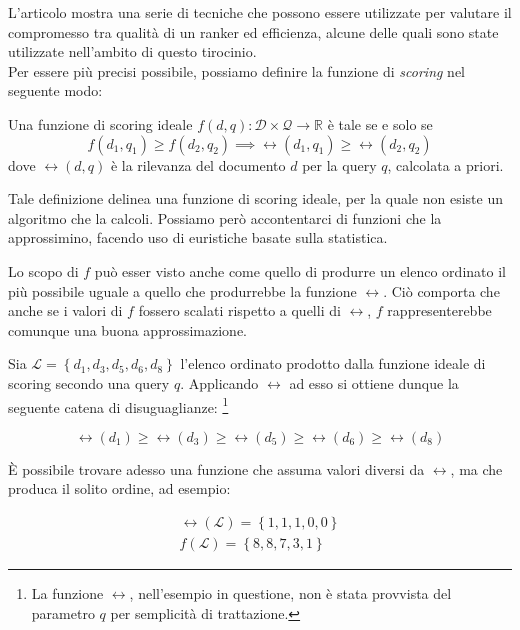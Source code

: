 L'articolo \cite{10.1016/j.ipm.2016.05.004} mostra una serie di tecniche che possono essere
utilizzate per valutare il compromesso tra qualità di un ranker ed efficienza, 
alcune delle quali sono state utilizzate nell'ambito di questo tirocinio.\\
Per essere più precisi possibile, possiamo definire la funzione di \textit{scoring} nel seguente modo:

\begin{definizione}\label{def:funzione_di_score_ideale}
	Una funzione di scoring ideale $f(d,q) : \mathcal{D} \times \mathcal{Q} \rightarrow \mathbb{R}$ è tale
	se e solo se
	$$
	f(d_1,q_1) \geq f(d_2, q_2) \implies \rel(d_1, q_1) \geq \rel(d_2, q_2)
	$$
dove $\rel(d,q)$ è la rilevanza del documento $d$ per la query $q$, calcolata a priori.	
\end{definizione}

Tale definizione delinea una funzione di scoring ideale, per la quale non esiste un algoritmo che
la calcoli. Possiamo però accontentarci di funzioni che la approssimino, facendo uso di euristiche basate sulla statistica.

Lo scopo di $f$ può esser visto anche come quello di produrre un elenco ordinato il più possibile uguale a quello
che produrrebbe la funzione $\rel$. Ciò comporta che anche se i valori di $f$ fossero scalati rispetto a quelli di $\rel$,
$f$ rappresenterebbe comunque una buona approssimazione.

\begin{esempio}
	Sia $\mathcal{L}= \left\{d_1, d_3, d_5, d_6, d_8 \right\}$ l'elenco ordinato prodotto
	dalla funzione ideale di scoring secondo una query $q$. Applicando $\rel$ ad esso si ottiene dunque la seguente catena
	di disuguaglianze: \footnote{La funzione $\rel$, nell'esempio in questione, non è stata provvista del parametro $q$ per semplicità di trattazione.}
	
	$$
	\rel(d_1) \geq \rel(d_3) \geq \rel(d_5) \geq \rel(d_6) \geq  \rel(d_8)
	$$
	
	\`E possibile trovare adesso una funzione che assuma valori diversi da $\rel$, ma che produca il solito ordine,
	ad esempio:
	
	\begin{align*}
	\rel(\mathcal{L}) = \left\{1, 1, 1, 0, 0\right\} \\
	f(\mathcal{L}) = \left\{8, 8, 7, 3, 1\right\}
	\end{align*}
	
\end{esempio}

